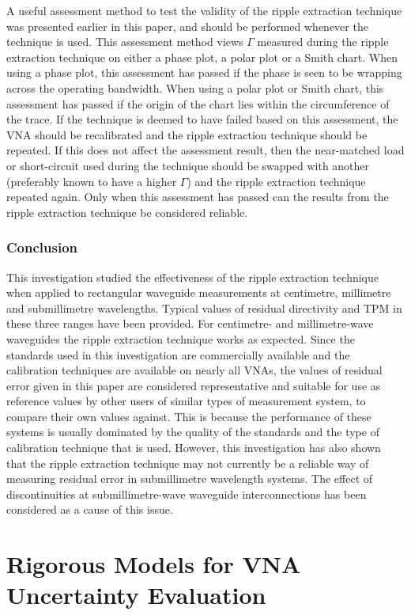 \documentclass[../thesis/thesis.tex]{subfiles}
\begin{document}
A useful assessment method to test the validity of the ripple extraction technique was presented earlier in this paper, and should be performed whenever the technique is used. This assessment method views $\Gamma$ measured during the ripple extraction technique on either a phase plot, a polar plot or a Smith chart. When using a phase plot, this assessment has passed if the phase is seen to be wrapping across the operating bandwidth. When using a polar plot or Smith chart, this assessment has passed if the origin of the chart lies within the circumference of the trace. If the technique is deemed to have failed based on this assessment, the VNA should be recalibrated and the ripple extraction technique should be repeated. If this does not affect the assessment result, then the near-matched load or short-circuit used during the technique should be swapped with another (preferably known to have a higher $\Gamma$) and the ripple extraction technique repeated again. Only when this assessment has passed can the results from the ripple extraction technique be considered reliable.

\subsubsection{Conclusion}

This investigation studied the effectiveness of the ripple extraction technique when applied to rectangular waveguide measurements at centimetre, millimetre and submillimetre wavelengths. Typical values of residual directivity and TPM in these three ranges have been provided. For centimetre- and millimetre-wave waveguides the ripple extraction technique works as expected. Since the standards used in this investigation are commercially available and the calibration techniques are available on nearly all VNAs, the values of residual error given in this paper are considered representative and suitable for use as reference values by other users of similar types of measurement system, to compare their own values against. This is because the performance of these systems is usually dominated by the quality of the standards and the type of calibration technique that is used. However, this investigation has also shown that the ripple extraction technique may not currently be a reliable way of measuring residual error in submillimetre wavelength systems. The effect of discontinuities at submillimetre-wave waveguide interconnections has been considered as a cause of this issue.

\section{Rigorous Models for VNA Uncertainty Evaluation}
\end{document}
